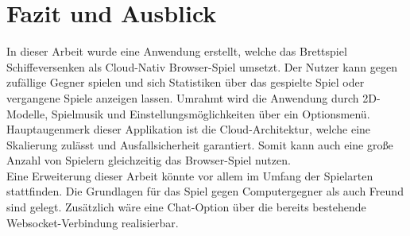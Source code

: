 \documentclass[a4paper, 10pt, conference]{IEEEtran}
\begin{document}
\section{Fazit und Ausblick}\label{sec:fazit}
In dieser Arbeit wurde eine Anwendung erstellt, welche das Brettspiel Schiffeversenken als Cloud-Nativ Browser-Spiel umsetzt. Der Nutzer kann gegen zufällige Gegner spielen und sich Statistiken über das gespielte Spiel oder vergangene Spiele anzeigen lassen. Umrahmt wird die Anwendung durch 2D-Modelle, Spielmusik und Einstellungsmöglichkeiten über ein Optionsmenü. Hauptaugenmerk dieser Applikation ist die Cloud-Architektur, welche eine Skalierung zulässt und Ausfallsicherheit garantiert. Somit kann auch eine große Anzahl von Spielern gleichzeitig das Browser-Spiel nutzen.\\
Eine Erweiterung dieser Arbeit könnte vor allem im Umfang der Spielarten stattfinden. Die Grundlagen für das Spiel gegen Computergegner als auch Freund sind gelegt. Zusätzlich wäre eine Chat-Option über die bereits bestehende Websocket-Verbindung realisierbar. \\



\printbibliography
\end{document}
